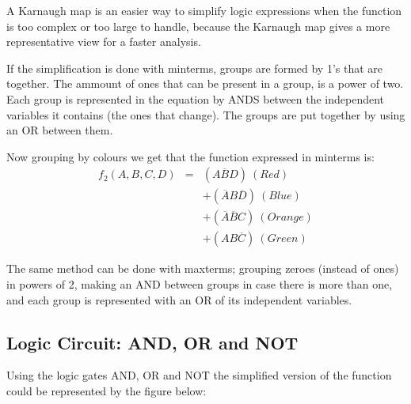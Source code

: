     A Karnaugh map is an easier way to simplify logic expressions when the function is too complex or too large to handle, because the Karnaugh map gives a more representative view for a faster analysis.

    If the simplification is done with minterms, groups are formed by 1's that are together. The ammount of ones that can be present in a group, is a power of two. Each group is represented in the equation by ANDS between the independent variables it contains (the ones that change). The groups are put together by using an OR between them.
    \begin{center}
        \begin{Karnaugh}
        \end{Karnaugh}
    \end{center}

    Now grouping by colours we get that the function expressed in minterms is:
    \begin{eqnarray*}
        f_2(A,B,C,D)&=&(A\overline{B}D)~(Red)\\
        &&+(\overline{A}B\overline{D})~(Blue)\\
        &&+(\overline{A}\overline{B}C)~(Orange)\\
        &&+(AB\overline{C})~(Green)
    \end{eqnarray*}

    The same method can be done with maxterms; grouping zeroes (instead of ones) in powers of 2, making an AND between groups in case there is more than one, and each group is represented with an OR of its independent variables.

    \subsection{\color{purple}Logic Circuit: AND, OR and NOT}

    Using the logic gates AND, OR and NOT the simplified version of the function could be represented by the figure below:

